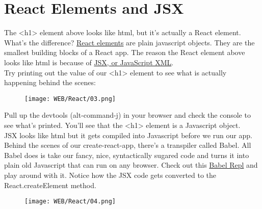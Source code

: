 \documentclass{42-en}
\begin{document}
\section{React Elements and JSX}
The <h1> element above looks like html, but it’s actually a React element. What’s the difference? \href{https://reactjs.org/docs/rendering-elements.html}{React elements} are plain javascript objects. They are the smallest building blocks of a React app. The reason the React element above looks like html is because of  \href{https://reactjs.org/docs/introducing-jsx.html}{JSX, or JavaScript XML}.\\
\newline
Try printing out the value of our <h1> element to see what is actually happening behind the scenes:
\begin{figure}[H]
    \begin{center}
        \texttt{[image: WEB/React/03.png]}
    \end{center}
\end{figure}
Pull up the devtools (alt-command-j) in your browser and check the console to see what’s printed. You’ll see that the <h1> element is a Javascript object.\\
\newline
JSX looks like html but it gets compiled into Javascript before we run our app. Behind the scenes of our create-react-app, there’s a transpiler called Babel. All Babel does is take our fancy, nice, syntactically sugared code and turns it into plain old Javascript that can run on any browser. Check out this \href{https://babeljs.io/repl/}{Babel Repl} and play around with it. Notice how the JSX code gets converted to the React.createElement method.
\begin{figure}[H]
    \begin{center}
        \texttt{[image: WEB/React/04.png]}
    \end{center}
\end{figure}


\nextexercice


\end{document}
